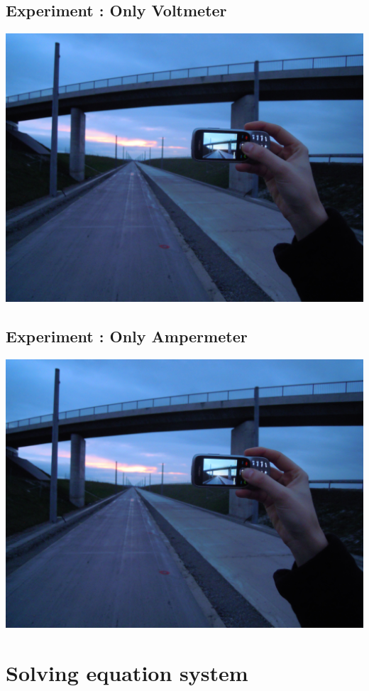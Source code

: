 \documentclass[12pt]{article}
\begin{document}
    \subsection{Experiment : Only Voltmeter}\label{subsec:experiment-2}
    \includegraphics[width=\linewidth]{images/schemes/scheme0.png}

    \subsection{Experiment : Only Ampermeter}\label{subsec:experiment-3}
    \includegraphics[width=\linewidth]{images/schemes/scheme0.png}


    \section{Solving equation system}\label{sec:solving-equation-system}
\end{document}
